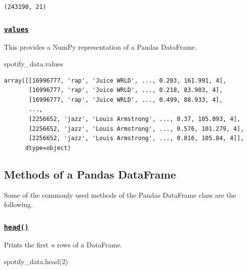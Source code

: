 \documentclass[
  letterpaper,
  DIV=11,
  numbers=noendperiod]{scrreprt}
\newenvironment{Shaded}{\begin{snugshade}}{\end{snugshade}}
\newcommand{\DecValTok}[1]{\textcolor[rgb]{0.68,0.00,0.00}{#1}}
\newcommand{\NormalTok}[1]{\textcolor[rgb]{0.00,0.23,0.31}{#1}}
\begin{document}
\begin{verbatim}
(243190, 21)
\end{verbatim}

\hypertarget{values}{%
\subsubsection{\texorpdfstring{\href{https://pandas.pydata.org/docs/reference/api/pandas.DataFrame.values.html}{\texttt{values}}}{values}}\label{values}}

This provides a NumPy representation of a Pandas DataFrame.

\begin{Shaded}
\begin{Highlighting}[]
\NormalTok{spotify\_data.values}
\end{Highlighting}
\end{Shaded}

\begin{verbatim}
array([[16996777, 'rap', 'Juice WRLD', ..., 0.203, 161.991, 4],
       [16996777, 'rap', 'Juice WRLD', ..., 0.218, 83.903, 4],
       [16996777, 'rap', 'Juice WRLD', ..., 0.499, 88.933, 4],
       ...,
       [2256652, 'jazz', 'Louis Armstrong', ..., 0.37, 105.093, 4],
       [2256652, 'jazz', 'Louis Armstrong', ..., 0.576, 101.279, 4],
       [2256652, 'jazz', 'Louis Armstrong', ..., 0.816, 105.84, 4]],
      dtype=object)
\end{verbatim}

\hypertarget{methods-of-a-pandas-dataframe}{%
\subsection{Methods of a Pandas
DataFrame}\label{methods-of-a-pandas-dataframe}}

Some of the commonly used methods of the Pandas DataFrame class are the
following.

\hypertarget{head}{%
\subsubsection{\texorpdfstring{\href{https://pandas.pydata.org/docs/reference/api/pandas.DataFrame.head.html}{\texttt{head()}}}{head()}}\label{head}}

Prints the first \emph{n} rows of a DataFrame.

\begin{Shaded}
\begin{Highlighting}[]
\NormalTok{spotify\_data.head(}\DecValTok{2}\NormalTok{)}
\end{Highlighting}
\end{Shaded}
\end{document}

